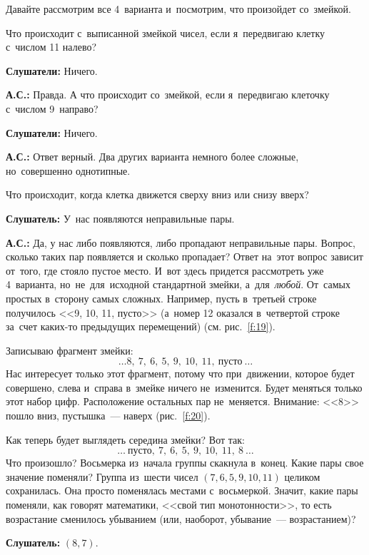 Давайте рассмотрим все 4~варианта и~посмотрим, что произойдет со~змейкой.

Что происходит с~выписанной змейкой чисел, если я~передвигаю клетку с~числом 11 налево?

\textbf{Слушатели:} Ничего.

\textbf{А.С.:} Правда. А что происходит со~змейкой, если я~передвигаю клеточку с~числом 9~направо?

\textbf{Слушатели:} Ничего.

\textbf{А.С.:} Ответ верный. Два других варианта немного более сложные, но~совершенно однотипные.

Что происходит, когда клетка движется сверху вниз или снизу вверх?

\textbf{Слушатель:} У~нас появляются неправильные пары.

\textbf{А.С.:} Да, у нас либо появляются, либо пропадают неправильные пары.
Вопрос, сколько таких пар появляется и сколько пропадает? Ответ на~этот вопрос зависит от~того, где стояло пустое место.
И~вот здесь придется
рассмотреть уже 4~варианта, но~не~для~исходной стандартной змейки, а~для~\textit{любой}. От~самых простых
в~сторону самых сложных. Например, пусть в~третьей строке получилось <<9, 10, 11, пусто>> (а~номер 12
оказался в~четвертой строке за~счет каких-то предыдущих перемещений) (см. рис.~\ref{f:19}).


Записываю фрагмент змейки:
$$
\ldots 8,\ 7,\ 6,\ 5,\ 9,\ 10,\ 11,\ \text{пусто}\ \ldots
$$
Нас интересует только этот фрагмент, потому что при~движении, которое будет совершено, слева
и~справа в~змейке ничего не~изменится. Будет меняться только этот набор цифр. Расположение остальных
пар не~меняется. Внимание: <<8>> пошло вниз, пустышка~--- наверх (рис.~\ref{f:20}).


Как теперь будет выглядеть середина змейки? Вот так:
$$
\ldots\ \text{пусто},\ 7, \ 6, \ 5, \ 9, \ 10, \ 11, \ 8 \ \ldots
$$
Что произошло? Восьмерка из~начала группы скакнула в~конец. Какие пары свое значение поменяли?
Группа из~шести чисел $(7, 6, 5, 9, 10, 11)$ целиком сохранилась. Она просто поменялась местами
с~восьмеркой. Значит, какие пары поменяли, как говорят математики, <<свой тип монотонности>>, то есть
возрастание сменилось убыванием (или, наоборот, убывание~--- возрастанием)?

\textbf{Слушатель:} $(8, 7)$.

